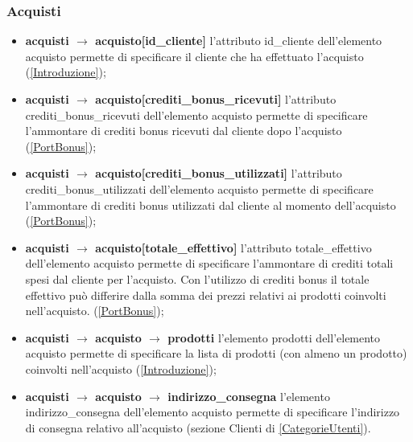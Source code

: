 \documentclass[a4paper, 14pt]{article}
\begin{document}
\begin{flushleft}
			\subsubsection{Acquisti}
			\begin{itemize}
				\item \textbf{acquisti $\rightarrow$ acquisto[id\_cliente] } l'attributo id\_cliente dell'elemento acquisto permette di specificare il cliente che ha effettuato l'acquisto (\ref{Introduzione});
				\item \textbf{acquisti $\rightarrow$ acquisto[crediti\_bonus\_ricevuti] } l'attributo crediti\_bonus\_ricevuti dell'elemento acquisto permette di specificare l'ammontare di crediti bonus ricevuti dal cliente dopo l'acquisto (\ref{PortBonus});
				\item \textbf{acquisti $\rightarrow$ acquisto[crediti\_bonus\_utilizzati] } l'attributo crediti\_bonus\_utilizzati dell'elemento acquisto permette di specificare l'ammontare di crediti bonus utilizzati dal cliente al momento dell'acquisto (\ref{PortBonus});
				\item \textbf{acquisti $\rightarrow$ acquisto[totale\_effettivo] } l'attributo totale\_effettivo dell'elemento acquisto permette di specificare l'ammontare di crediti totali spesi dal cliente per l'acquisto. Con l'utilizzo di crediti bonus il totale effettivo può differire dalla somma dei prezzi relativi ai prodotti coinvolti nell'acquisto. (\ref{PortBonus});
				\item \textbf{acquisti $\rightarrow$ acquisto $\rightarrow$ prodotti } l'elemento prodotti dell'elemento acquisto permette di specificare la lista di prodotti (con almeno un prodotto) coinvolti nell'acquisto (\ref{Introduzione});
				\item \textbf{acquisti $\rightarrow$ acquisto $\rightarrow$ indirizzo\_consegna } l'elemento indirizzo\_consegna dell'elemento acquisto permette di specificare l'indirizzo di consegna relativo all'acquisto (sezione Clienti di \ref{CategorieUtenti}).
			\end{itemize}
			\smallskip

\end{flushleft}
\end{document}
